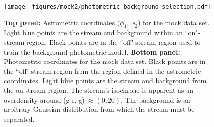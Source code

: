 \documentclass[twocolumn, linenumbers]{aastex631}
\begin{document}
        \begin{figure}
            \centering
            \texttt{[image: figures/mock2/photometric\_background\_selection.pdf]}
            \caption{
                \textbf{Top panel:} Astrometric coordinates ($\phi_1$, $\phi_2$)
                for the mock data set.  Light blue points are the stream and
                background within an ``on"-stream region. Black points are in
                the ``off"-stream region used to train the background
                photometric model.
                \textbf{Bottom panel:} Photometric coordinates for the mock data
                set.  Black points are in the ``off"-stream region from the
                region defined in the astrometric coordinates.  Light blue
                points are the stream and background from the on-stream region.
                The stream's isochrone is apparent as an overdensity around
                (g-r, g)$\ \approx (0, 20)$.  The background is an arbitrary
                Gaussian distribution from which the stream must be separated.
            }
            \label{fig:mock_data_photometric_background_selection}
        \end{figure}
\end{document}
